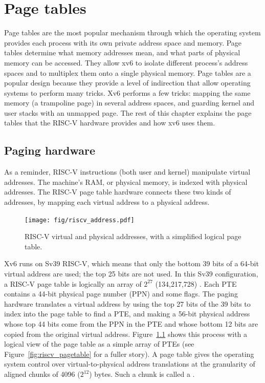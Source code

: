 \chapter{Page tables}
\label{CH:MEM}

Page tables are the most popular mechanism through which the operating
system provides each process with its own private address space and
memory.  Page tables determine what memory addresses mean, and what
parts of physical memory can be accessed. They allow xv6 to isolate
different process's address spaces and to multiplex them onto a single
physical memory. Page tables are a popular design because they provide
a level of indirection that allow operating systems to perform many
tricks. Xv6 performs a few tricks: mapping the same memory
(a trampoline page) in several address spaces, and guarding kernel and
user stacks with an unmapped page. The rest of this chapter explains
the page tables that the RISC-V hardware provides and how xv6 uses
them.

\section{Paging hardware}
As a reminder,
RISC-V instructions (both user and kernel) manipulate virtual addresses.
The machine's RAM, or physical memory, is indexed with physical
addresses.
The RISC-V page table hardware connects these two kinds of addresses,
by mapping each virtual address to a physical address.

\begin{figure}[t]
\center
\texttt{[image: fig/riscv\_address.pdf]}
\caption{RISC-V virtual and physical addresses, with a simplified
logical page table.}
\label{fig:riscv_address}
\end{figure}

Xv6 runs on Sv39 RISC-V, which means that only the bottom 39
bits of a 64-bit virtual address are used; the top 25 bits
are not used.
In this Sv39 configuration, a
RISC-V page table is logically an array of $2^{27}$ (134,217,728)
.  Each PTE contains a 44-bit
physical page number (PPN) and some flags. The paging hardware
translates a virtual address by using the top 27 bits of the 39 bits
to index into the page table to find a PTE, and making a 56-bit
physical address whose top 44 bits come from the PPN in the PTE
and whose bottom 12 bits are copied from the original virtual address.
Figure~\ref{fig:riscv_address} shows this
process with a logical view of the page table as a simple array of PTEs
(see Figure~\ref{fig:riscv_pagetable} for a fuller story).
A page table
gives the operating system control over virtual-to-physical address
translations at the granularity of aligned chunks of 4096 ($2^{12}$)
bytes.  Such a chunk is called a .

